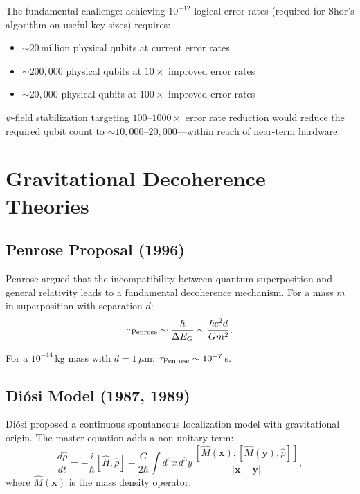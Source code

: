 \documentclass[11pt,letterpaper]{article}
\begin{document}
The fundamental challenge: achieving $10^{-12}$ logical error rates
(required for Shor's algorithm on useful key sizes) requires:
\begin{itemize}
\item $\sim 20$\,million physical qubits at current error rates
\item $\sim 200{,}000$ physical qubits at $10\times$ improved error rates
\item $\sim 20{,}000$ physical qubits at $100\times$ improved error rates
\end{itemize}

$\psi$-field stabilization targeting $100$--$1000\times$ error rate
reduction would reduce the required qubit count to
$\sim 10{,}000$--$20{,}000$---within reach of near-term hardware.

\section{Gravitational Decoherence Theories}

\subsection{Penrose Proposal (1996)}

Penrose argued that the incompatibility between quantum superposition and
general relativity leads to a fundamental decoherence mechanism. For a
mass $m$ in superposition with separation $d$:
\begin{equation}
\tau_{\rm Penrose} \sim \frac{\hbar}{\Delta E_G}
\sim \frac{\hbar c^2 d}{G m^2}.
\end{equation}

For a $10^{-14}$\,kg mass with $d = 1\,\mu$m:
$\tau_{\rm Penrose} \sim 10^{-7}$\,s.

\subsection{Di\'osi Model (1987, 1989)}

Di\'osi proposed a continuous spontaneous localization model with
gravitational origin. The master equation adds a non-unitary term:
\begin{equation}
\frac{d\hat{\rho}}{dt} = -\frac{i}{\hbar}[\hat{H}, \hat{\rho}]
- \frac{G}{2\hbar}\int d^3x\,d^3y\,
\frac{[\hat{M}(\mathbf{x}), [\hat{M}(\mathbf{y}), \hat{\rho}]]}
{|\mathbf{x} - \mathbf{y}|},
\end{equation}
where $\hat{M}(\mathbf{x})$ is the mass density operator.
\end{document}
